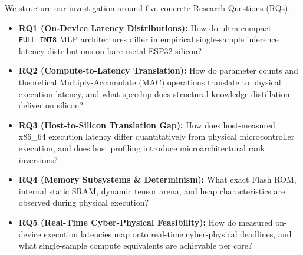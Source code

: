 \documentclass[journal,10pt]{IEEEtran}
\begin{document}
We structure our investigation around five concrete Research Questions (RQs):
\begin{itemize}
    \item \textbf{RQ1 (On-Device Latency Distributions):} How do ultra-compact \texttt{FULL\_INT8} MLP architectures differ in empirical single-sample inference latency distributions on bare-metal ESP32 silicon?
    \item \textbf{RQ2 (Compute-to-Latency Translation):} How do parameter counts and theoretical Multiply-Accumulate (MAC) operations translate to physical execution latency, and what speedup does structural knowledge distillation deliver on silicon?
    \item \textbf{RQ3 (Host-to-Silicon Translation Gap):} How does host-measured x86\_64 execution latency differ quantitatively from physical microcontroller execution, and does host profiling introduce microarchitectural rank inversions?
    \item \textbf{RQ4 (Memory Subsystems \& Determinism):} What exact Flash ROM, internal static SRAM, dynamic tensor arena, and heap characteristics are observed during physical execution?
    \item \textbf{RQ5 (Real-Time Cyber-Physical Feasibility):} How do measured on-device execution latencies map onto real-time cyber-physical deadlines, and what single-sample compute equivalents are achievable per core?
\end{itemize}
\end{document}
